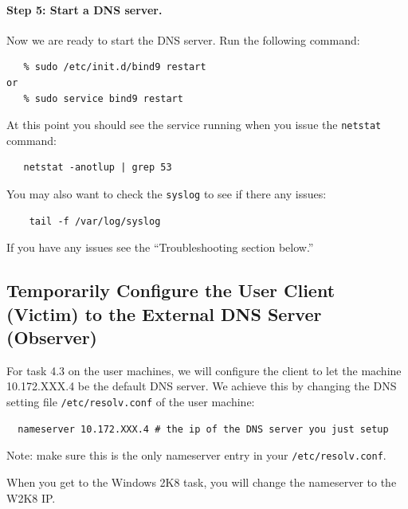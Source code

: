 \documentclass{article}
\begin{document}
\paragraph{Step 5: Start a DNS server.}
Now we are ready to start the DNS server.  Run the following command:

\begin{verbatim}
   % sudo /etc/init.d/bind9 restart
or
   % sudo service bind9 restart
\end{verbatim}

At this point you should see the service running when you issue the {\tt netstat} command:

\begin{verbatim}
   netstat -anotlup | grep 53
\end{verbatim}

You may also want to check the {\tt syslog} to see if there any
issues:
\begin{verbatim}
    tail -f /var/log/syslog    
\end{verbatim}

If you have any issues see the ``Troubleshooting section below.''
\subsection{Temporarily Configure the User \ubuntu Client (Victim) to the External DNS \ubuntu Server (Observer)} 
\label{subsec:user_machine}

For task 4.3 on the user machines, we will configure the client to let the machine
10.172.XXX.4 be the default DNS server. We achieve this by changing
the DNS setting file \texttt{/etc/resolv.conf} of the user machine:

\begin{verbatim}
  nameserver 10.172.XXX.4 # the ip of the DNS server you just setup
\end{verbatim}

\noindent
Note: make sure this is the only nameserver entry in your \texttt{/etc/resolv.conf}.

When you get to the Windows 2K8 task, you will change the nameserver to the W2K8 IP.

\end{document}
